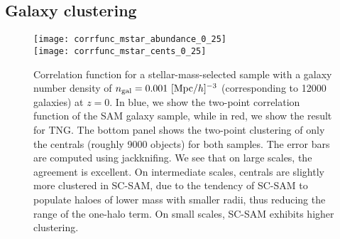 \documentclass[fleqn,usenatbib]{mnras}
\begin{document}
\subsection{Galaxy clustering}
\label{sec:clust}
\begin{figure}
\centering  
\texttt{[image: corrfunc\_mstar\_abundance\_0\_25]} \\
\texttt{[image: corrfunc\_mstar\_cents\_0\_25]} 
\caption{Correlation function for a stellar-mass-selected sample with a galaxy number density of $n_{\rm gal} = 0.001 \ [{\rm Mpc}/h]^{-3}$ (corresponding to 12000 galaxies) at $z = 0$. In blue, we show the two-point correlation function of the SAM galaxy sample, while in red, we show the result for TNG. The bottom panel shows the two-point clustering of only the centrals (roughly 9000 objects) for both samples. The error bars are computed using jackknifing. We see that on large scales, the agreement is excellent. On intermediate scales, centrals are slightly more clustered in SC-SAM, due to the tendency of SC-SAM to populate haloes of lower mass with smaller radii, thus reducing the range of the one-halo term. On small scales, SC-SAM exhibits higher clustering.}
\label{fig:corrfunc}
\end{figure}
\end{document}
